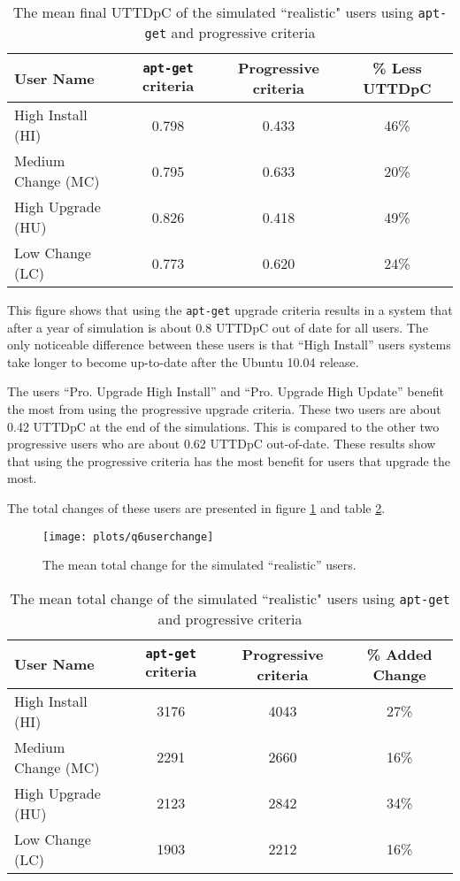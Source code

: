 \begin{table}[h!]
\centering
\begin{tabular}{|l | c | c | c | }
\hline
User Name 				& \texttt{apt-get} criteria & Progressive criteria 	& \% Less UTTDpC	\\ \hline
High Install (HI)			& 0.798				& 0.433 			& 46\%	\\
Medium Change (MC)			& 0.795				& 0.633 			& 20\% 	\\
High Upgrade (HU)			& 0.826				& 0.418				& 49\%  \\
Low Change 	(LC)			& 0.773				& 0.620 			& 24\%   \\ \hline
\end{tabular}
\caption{The mean final UTTDpC of the simulated ``realistic" users using \texttt{apt-get} and progressive criteria}
\label{exp.tblq6uttd}
\end{table}

This figure shows that using the \texttt{apt-get} upgrade criteria results in a system that after a year of simulation is about 0.8 UTTDpC out of date for all users. 
The only noticeable difference between these users is that ``High Install'' users systems take longer to become up-to-date after the Ubuntu 10.04 release.


The users ``Pro. Upgrade High Install'' and ``Pro. Upgrade High Update'' benefit the most from using the progressive upgrade criteria.
These two users are about 0.42 UTTDpC at the end of the simulations.
This is compared to the other two progressive users who are about 0.62 UTTDpC out-of-date.
These results show that using the progressive criteria has the most benefit for users that upgrade the most.      

The total changes of these users are presented in figure \ref{exp.q6userchange} and table \ref{exp.tblq6change}.
\begin{figure}[htp]
\begin{center}
  \texttt{[image: plots/q6userchange]}
  \caption{The mean total change for the simulated ``realistic'' users.}
  \label{exp.q6userchange}
\end{center}
\end{figure}

\begin{table}[h!]
\centering
\begin{tabular}{|l | c | c | c | }
\hline
User Name 				& \texttt{apt-get} criteria 		& Progressive criteria 	& \% Added Change	\\ \hline
High Install (HI)			& 3176			& 4043 	& 27\% 	\\
Medium Change (MC)			& 2291			& 2660 	& 16\% 	\\
High Upgrade (HU)			& 2123			& 2842	& 34\%   \\
Low Change 	(LC)			& 1903			& 2212 	& 16\%   \\ \hline
\end{tabular}
\caption{The mean total change of the simulated ``realistic" users using \texttt{apt-get} and progressive criteria}
\label{exp.tblq6change}
\end{table}

